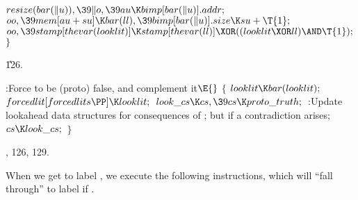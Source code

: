 ${}\\{resize}(\\{bar}(\|u)),\39\|o,\39\\{au}\K\\{bimp}[\\{bar}(\|u)].%
\\{addr};{}$\2\6
${}\\{oo},\39\\{mem}[\\{au}+\\{su}]\K\\{bar}(\\{ll}),\39\\{bimp}[\\{bar}(\|u)].%
\\{size}\K\\{su}+\T{1};{}$\6
${}\\{oo},\39\\{stamp}[\\{thevar}(\\{looklit})]\K\\{stamp}[\\{thevar}(\\{ll})]%
\XOR((\\{looklit}\XOR\\{ll})\AND\T{1});{}$\6
\4${}\}{}$\2\par
\U126.\fi

\B{}:Force  to be (proto) false, and
complement it\X${}\E{}$\6
${}\{{}$\1\6
${}\\{looklit}\K\\{bar}(\\{looklit});{}$\6
${}\\{forcedlit}[\\{forcedlits}\PP]\K\\{looklit};{}$\6
${}\\{look\_cs}\K\\{cs},\39\\{cs}\K\\{proto\_truth};{}$\6
:Update lookahead data structures for consequences of ;
but  if a contradiction arises\X;\6
${}\\{cs}\K\\{look\_cs};{}$\6
\4${}\}{}$\2\par
{}, 126, 129.\fi

When we get to label , we execute the
following
instructions, which will ``fall through'' to label  if
.

